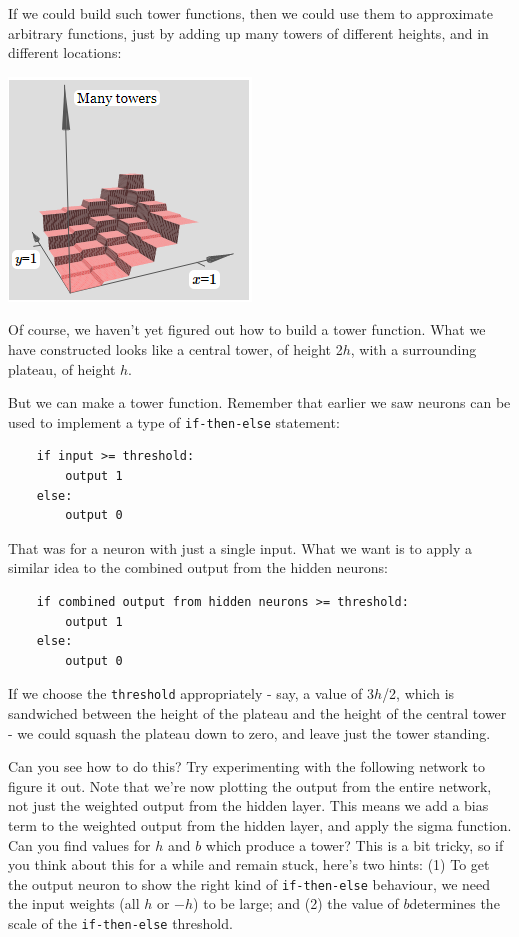 If we could build such tower functions, then we could use them to approximate arbitrary functions, just by adding up many towers of different heights, and in different locations:

{\centering \includegraphics[width=.5\textwidth,]{pic/wigglyfn33} \par}

Of course, we haven't yet figured out how to build a tower function. What we have constructed looks like a central tower, of height 2$h$, with a surrounding plateau, of height $h$.

But we can make a tower function. Remember that earlier we saw neurons can be used to implement a type of \lstinline{if-then-else} statement:

\begin{lstlisting}
    if input >= threshold: 
        output 1
    else:
        output 0
\end{lstlisting}
That was for a neuron with just a single input. What we want is to apply a similar idea to the combined output from the hidden neurons:
\begin{verbatim}
    if combined output from hidden neurons >= threshold:
        output 1
    else:
        output 0
\end{verbatim}


If we choose the \lstinline{threshold} appropriately - say, a value of 3$h$/2, which is sandwiched between the height of the plateau and the height of the central tower - we could squash the plateau down to zero, and leave just the tower standing.

Can you see how to do this? Try experimenting with the following network to figure it out. Note that we're now plotting the output from the entire network, not just the weighted output from the hidden layer. This means we add a bias term to the weighted output from the hidden layer, and apply the sigma function. Can you find values for $h$
and $b$ which produce a tower? This is a bit tricky, so if you think about this for a while and remain stuck, here's two hints: (1) To get the output neuron to show the right kind of \lstinline{if-then-else} behaviour, we need the input weights (all $h$ or $-h$) to be large; and (2) the value of $b$determines the scale of the \lstinline{if-then-else} threshold.


